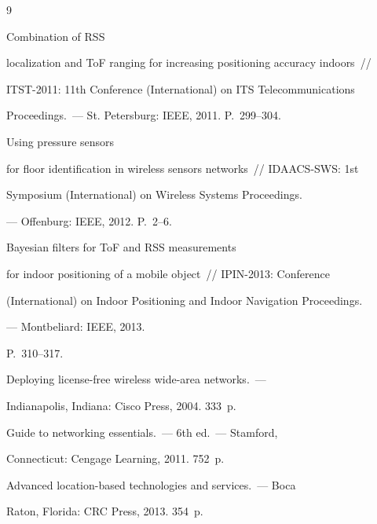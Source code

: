 {\small\frenchspacing

{%


\begin{thebibliography}{9}


 Combination of RSS

localization and ToF ranging for increasing positioning accuracy indoors~/\!\!/

ITST-2011: 11th Conference (International) on ITS Telecommunications

Proceedings.~--- St. Petersburg: IEEE, 2011. P.~299--304.


 Using pressure sensors

for floor identification in wireless sensors networks~/\!\!/ IDAACS-SWS: 1st

Symposium (International) on Wireless Systems Proceedings.


--- Offenburg: IEEE, 2012. P.~2--6.


 Bayesian filters for ToF and RSS measurements

for indoor positioning of a mobile object~/\!\!/ IPIN-2013: Conference

(International) on Indoor Positioning and Indoor Navigation Proceedings.


--- Montbeliard: IEEE, 2013.

P.~310--317.


 Deploying license-free wireless wide-area networks.~---

Indianapolis, Indiana: Cisco Press, 2004. 333~p.


 Guide to networking essentials.~--- 6th ed.~--- Stamford,

Connecticut: Cengage Learning, 2011. 752~p.


 Advanced location-based technologies and services.~--- Boca

Raton, Florida: CRC Press, 2013. 354~p.



\end{thebibliography}

}

}



